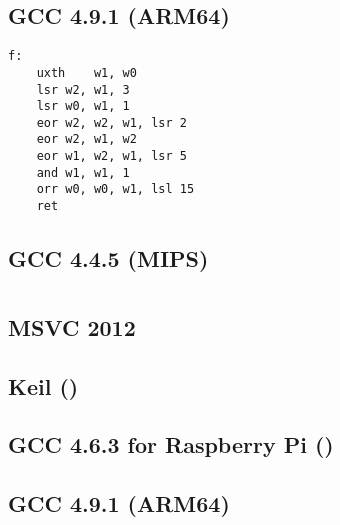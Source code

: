 \subsection{\Optimizing GCC 4.9.1 (ARM64)}

\begin{lstlisting}
f:
	uxth	w1, w0
	lsr	w2, w1, 3
	lsr	w0, w1, 1
	eor	w2, w2, w1, lsr 2
	eor	w2, w1, w2
	eor	w1, w2, w1, lsr 5
	and	w1, w1, 1
	orr	w0, w0, w1, lsl 15
	ret
\end{lstlisting}

\subsection{\Optimizing GCC 4.4.5 (MIPS)}



\section{}


\subsection{MSVC 2012}



\subsection{Keil (\ARMMode)}



\subsection{GCC 4.6.3 for Raspberry Pi (\ARMMode)}



\subsection{\Optimizing GCC 4.9.1 (ARM64)}

